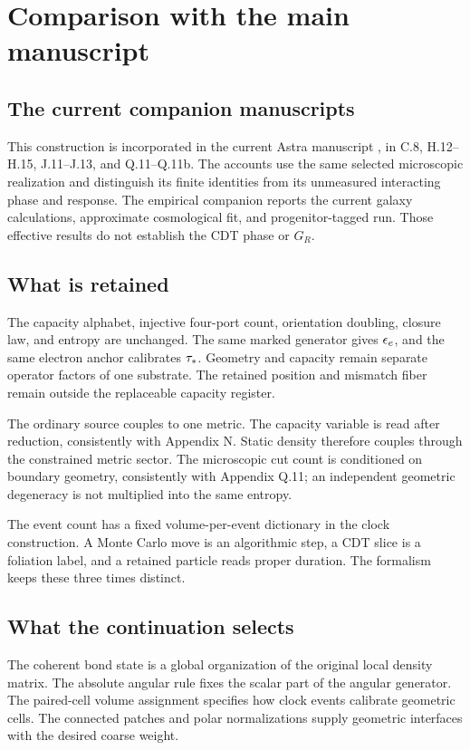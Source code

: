 \section{Comparison with the main manuscript}
\label{sec:comparison}

\subsection{The current companion manuscripts}
This construction is incorporated in the current Astra manuscript
\cite{current}, in C.8, H.12--H.15, J.11--J.13, and Q.11--Q.11b.
The accounts use the same selected microscopic realization and distinguish
its finite identities from its unmeasured interacting phase and response.
The empirical companion \cite{empirical} reports the current galaxy
calculations, approximate cosmological fit, and progenitor-tagged run.
Those effective results do not establish the CDT phase or $G_R$.

\subsection{What is retained}

The capacity alphabet, injective four-port count, orientation doubling, closure law, and entropy are unchanged. The same marked generator gives $\epsilon_e$, and the same electron anchor calibrates $\tau_*$. Geometry and capacity remain separate operator factors of one substrate. The retained position and mismatch fiber remain outside the replaceable capacity register.

The ordinary source couples to one metric. The capacity variable is read after reduction, consistently with Appendix N. Static density therefore couples through the constrained metric sector. The microscopic cut count is conditioned on boundary geometry, consistently with Appendix Q.11; an independent geometric degeneracy is not multiplied into the same entropy.

The event count has a fixed volume-per-event dictionary in the clock construction. A Monte Carlo move is an algorithmic step, a CDT slice is a foliation label, and a retained particle reads proper duration. The formalism keeps these three times distinct.

\subsection{What the continuation selects}

The coherent bond state is a global organization of the original local density matrix. The absolute angular rule fixes the scalar part of the angular generator. The paired-cell volume assignment specifies how clock events calibrate geometric cells. The connected patches and polar normalizations supply geometric interfaces with the desired coarse weight.

